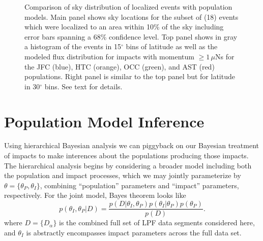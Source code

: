 \documentclass[twocolumn, trackchanges]{aastex62}
\begin{document}
\begin{figure}[h!]
\vspace*{-8mm}
\caption{Comparison of sky distribution of localized events with population models. Main panel shows sky locations for the subset of (18) events which were localized to an area within 10\% of the sky including error bars spanning a 68\% confidence level. Top panel shows in gray a histogram of the events in 15$^\circ$ bins of latitude as well as the modeled flux distribution for impacts with momentum $\geq 1\,\mu$Ns for the JFC (blue), HTC (orange), OCC (green), and AST (red) populations. Right panel is similar to the top panel but for latitude in 30$^\circ$ bins. See text for details. \label{fig:mapCompare}}
\end{figure}

\section{Population Model Inference} \label{sec:model_inference}

Using hierarchical Bayesian analysis we can piggyback on our Bayesian treatment of impacts to make interences about the populations producing those impacts. The hierarchical analysis begins by considering a broader model including both the population and impact processes, which we may jointly parameterize by $\theta=\{\theta_P,\theta_I\}$, combining ``population'' parameters and ``impact'' parameters, respectively.  For the joint model, Bayes theorem looks like
\begin{equation}
  p(\theta_I,\theta_P|D)=\frac{p(D|\theta_I,\theta_P)p(\theta_I|\theta_P)p(\theta_P)}{p(D)}.
\end{equation}
where $D=\{D_\alpha\}$ is the combined full set of LPF data segments considered here, and $\theta_I$ is abstractly encompasses impact parameters across the full data set.
\end{document}
